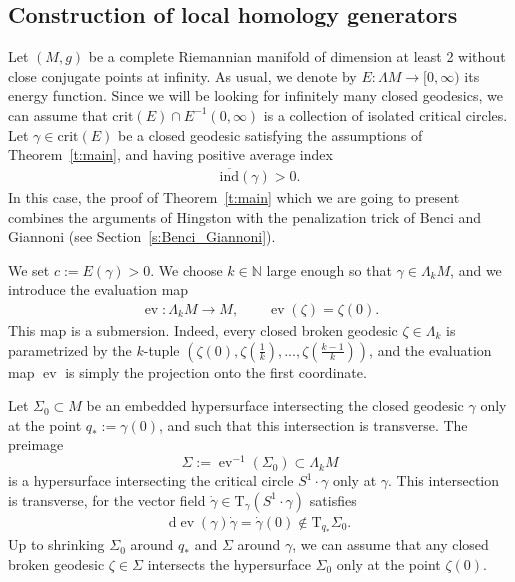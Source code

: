 \documentclass[reqno]{amsart}
\numberwithin{equation}{section}
\theoremstyle{personal}%
\theoremstyle{definition}
\newcommand{\N}{\mathds{N}}
\newcommand{\diff}{\mathrm{d}}
\newcommand{\Tan}{\mathrm{T}}
\newcommand{\crit}{\mathrm{crit}}
\newcommand{\avind}{\overline{\ind}}
\newcommand{\ind}{\mathrm{ind}}
\DeclareMathOperator{\ev}{\mathrm{ev}}
\begin{document}
\subsection{Construction of local homology generators}
\label{ss:construction}

Let $(M,g)$ be a complete Riemannian manifold of dimension at least 2 without close conjugate points at infinity. As usual, we denote by $E:\Lambda M\to[0,\infty)$ its energy function. Since we will be looking for infinitely many closed geodesics, we can assume that $\crit(E)\cap E^{-1}(0,\infty)$ is a collection of isolated critical circles.
Let $\gamma\in\crit(E)$ be a closed geodesic satisfying the assumptions of Theorem~\ref{t:main}, and having positive average index
\begin{align}
\label{e:positive_average_index}
 \avind(\gamma)>0.
\end{align}
In this case, the proof of Theorem~\ref{t:main} which we are going to present combines the arguments of Hingston \cite{Hingston:1993ou} with the penalization trick of Benci and Giannoni (see Section~\ref{s:Benci_Giannoni}).

We set $c:=E(\gamma)>0$. We choose $k\in\N$ large enough so that $\gamma\in\Lambda_kM$, and we introduce the evaluation map
\begin{align*}
\ev:\Lambda_kM\to M,
\qquad
\ev(\zeta)=\zeta(0).
\end{align*}
This map is a submersion. Indeed, every closed broken geodesic $\zeta\in\Lambda_k$ is parametrized by the $k$-tuple $(\zeta(0),\zeta(\tfrac1k),...,\zeta(\tfrac{k-1}k))$, and the evaluation map $\ev$ is simply the projection onto the first coordinate. 


Let $\Sigma_0\subset M$ be an embedded hypersurface intersecting the closed geodesic $\gamma$  only at the point 
$q_*:=\gamma(0)$,
and such that this intersection is transverse. The preimage 
\[\Sigma:=\ev^{-1}(\Sigma_0)\subset\Lambda_kM\] 
is a hypersurface intersecting the critical circle $S^1\cdot\gamma$ only at $\gamma$. This intersection is transverse, for the vector field $\dot\gamma\in\Tan_\gamma(S^1\cdot\gamma)$ satisfies
\begin{align*}
\diff\ev(\gamma)\dot\gamma = \dot\gamma(0)\not\in \Tan_{q_*}\Sigma_0.
\end{align*}
Up to shrinking $\Sigma_0$ around $q_*$ and $\Sigma$ around $\gamma$, we can assume that any closed broken geodesic $\zeta\in\Sigma$ intersects the hypersurface $\Sigma_0$ only at the point $\zeta(0)$.
\end{document}
